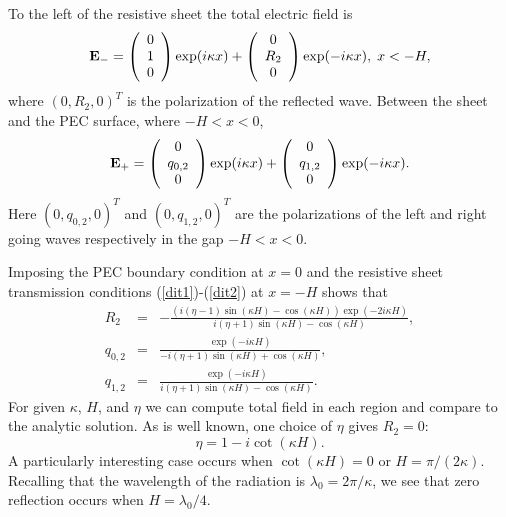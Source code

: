 \documentclass[a4paper,12pt]{article}
\begin{document}
To the left of the resistive
sheet the total electric field is 
\[
{\bf E}_{-}=\left(\begin{array}{c}0\\1\\0\end{array}\right)
\exp(i \kappa x)+ \left(\begin{array}{c}0\\R_2\\0\end{array}\right)\exp(-i\kappa x),\; x<-H,
\]
where $(0,R_2,0)^T$ is the polarization of the reflected wave.  Between the sheet and the PEC surface, where $-H<x<0$,
\[
{\bf E}_+=\left(\begin{array}{c}0\\q_{0,2}\\0\end{array}\right)
\exp(i \kappa x)+ \left(\begin{array}{c}0\\q_{1,2}\\0\end{array}\right)\exp(-i\kappa x).
\]
Here $(0,q_{0,2},0)^T$ and $(0,q_{1,2},0)^T$ are the polarizations of the left and right going waves respectively in the gap $-H<x<0$.

Imposing the PEC boundary condition at $x=0$ and the resistive sheet
transmission conditions (\ref{dit1})-(\ref{dit2}) at $x=-H$ shows that
\begin{eqnarray*}
  \mathit{R_2} &=& 
-\frac{\left(i\left( \eta -1\right) \sin \! \left(\kappa H \right)-\cos \! \left(\kappa H \right)\right) \exp\left(-2 i \kappa H\right)}{i\left( \eta +1\right) \sin \! \left(\kappa H \right)-\cos \! \left(\kappa  H \right)}, \\\mathit{q_{0,2}} &=& 
\frac{\exp\left(-i \kappa H\right)}{-i(\eta+1) \sin \! \left(\kappa H \right) +\cos \! \left(\kappa H \right)},\\
 \mathit{q_{1,2}} &= &
\frac{\exp\left(-i \kappa H\right)}{i\left( \eta +1\right) \sin \! \left(\kappa H \right)-\cos \! \left(\kappa H \right)}.
\end{eqnarray*}
For given $\kappa$, $H$, and $\eta$ we can compute total field in each region and compare to the analytic solution.  As is well known, one choice of $\eta$ gives $R_2=0$:
\[
\eta=1-i\cot(\kappa H).
\]
A particularly interesting case occurs when
$\cot(\kappa H)=0$ or $H=\pi/(2\kappa) $.  Recalling that the wavelength of the radiation is $\lambda_0=2\pi/\kappa$, we see that zero reflection occurs when $H=\lambda_0/4$.
\end{document}
